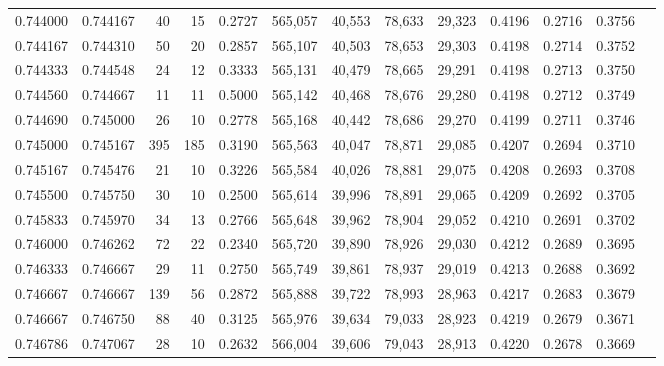 \begin{tabular}{rrrrrrrrrrrrr}
0.744000 & 0.744167 &    40 &  15 &                                     0.2727 & 565,057 &  40,553 &  78,633 &  29,323 & 0.4196 & 0.2716 & 0.3756 \\
0.744167 & 0.744310 &    50 &  20 &                                     0.2857 & 565,107 &  40,503 &  78,653 &  29,303 & 0.4198 & 0.2714 & 0.3752 \\
0.744333 & 0.744548 &    24 &  12 &                                     0.3333 & 565,131 &  40,479 &  78,665 &  29,291 & 0.4198 & 0.2713 & 0.3750 \\
0.744560 & 0.744667 &    11 &  11 &                                     0.5000 & 565,142 &  40,468 &  78,676 &  29,280 & 0.4198 & 0.2712 & 0.3749 \\
0.744690 & 0.745000 &    26 &  10 &                                     0.2778 & 565,168 &  40,442 &  78,686 &  29,270 & 0.4199 & 0.2711 & 0.3746 \\
0.745000 & 0.745167 &   395 & 185 &                                     0.3190 & 565,563 &  40,047 &  78,871 &  29,085 & 0.4207 & 0.2694 & 0.3710 \\
0.745167 & 0.745476 &    21 &  10 &                                     0.3226 & 565,584 &  40,026 &  78,881 &  29,075 & 0.4208 & 0.2693 & 0.3708 \\
0.745500 & 0.745750 &    30 &  10 &                                     0.2500 & 565,614 &  39,996 &  78,891 &  29,065 & 0.4209 & 0.2692 & 0.3705 \\
0.745833 & 0.745970 &    34 &  13 &                                     0.2766 & 565,648 &  39,962 &  78,904 &  29,052 & 0.4210 & 0.2691 & 0.3702 \\
0.746000 & 0.746262 &    72 &  22 &                                     0.2340 & 565,720 &  39,890 &  78,926 &  29,030 & 0.4212 & 0.2689 & 0.3695 \\
0.746333 & 0.746667 &    29 &  11 &                                     0.2750 & 565,749 &  39,861 &  78,937 &  29,019 & 0.4213 & 0.2688 & 0.3692 \\
0.746667 & 0.746667 &   139 &  56 &                                     0.2872 & 565,888 &  39,722 &  78,993 &  28,963 & 0.4217 & 0.2683 & 0.3679 \\
0.746667 & 0.746750 &    88 &  40 &                                     0.3125 & 565,976 &  39,634 &  79,033 &  28,923 & 0.4219 & 0.2679 & 0.3671 \\
0.746786 & 0.747067 &    28 &  10 &                                     0.2632 & 566,004 &  39,606 &  79,043 &  28,913 & 0.4220 & 0.2678 & 0.3669 \\

\end{tabular}
